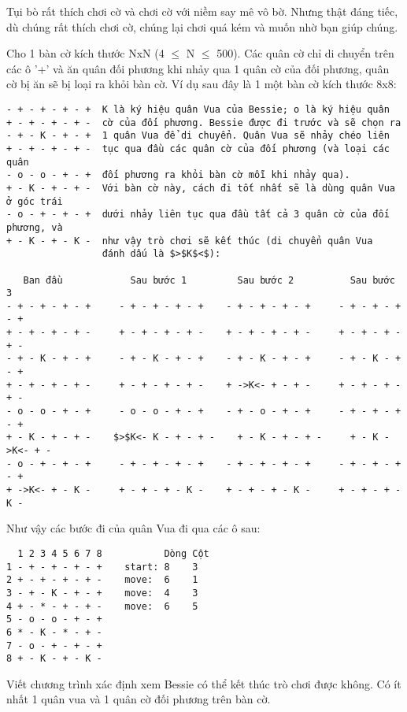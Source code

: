 



   Tụi bò rất thích chơi cờ và chơi cờ với niềm say mê vô bờ. Nhưng thật đáng tiếc, dù chúng rất thích chơi cờ, chúng lại chơi  quá kém và muốn nhờ bạn giúp chúng.  

   Cho 1 bàn cờ kích thước NxN (4  $\le$  N  $\le$  500).  Các quân cờ chỉ di chuyển trên các ô '+' và ăn quân đối phương khi nhảy qua 1 quân cờ của đối phương, quân cờ bị ăn sẽ bị loại ra khỏi bàn cờ. Ví dụ sau đây là 1 một bàn cờ kích thước 8x8:  
\begin{verbatim}
- + - + - + - +  K là ký hiệu quân Vua của Bessie; o là ký hiệu quân
+ - + - + - + -  cờ của đối phương. Bessie được đi trước và sẽ chọn ra 
- + - K - + - +  1 quân Vua để di chuyển. Quân Vua sẽ nhảy chéo liên 
+ - + - + - + -  tục qua đầu các quân cờ của đối phương (và loại các quân 
- o - o - + - +  đối phương ra khỏi bàn cờ mỗi khi nhảy qua).
+ - K - + - + -  Với bàn cờ này, cách đi tốt nhất sẽ là dùng quân Vua ở góc trái 
- o - + - + - +  dưới nhảy liên tục qua đầu tất cả 3 quân cờ của đối phương, và 
+ - K - + - K -  như vậy trò chơi sẽ kết thúc (di chuyển quân Vua
                 đánh dấu là $>$K$<$):

   Ban đầu            Sau bước 1         Sau bước 2          Sau bước 3
- + - + - + - +     - + - + - + - +    - + - + - + - +     - + - + - + - +
+ - + - + - + -     + - + - + - + -    + - + - + - + -     + - + - + - + -
- + - K - + - +     - + - K - + - +    - + - K - + - +     - + - K - + - +
+ - + - + - + -     + - + - + - + -    + ->K<- + - + -     + - + - + - + -
- o - o - + - +     - o - o - + - +    - + - o - + - +     - + - + - + - +
+ - K - + - + -    $>$K<- K - + - + -    + - K - + - + -     + - K ->K<- + -
- o - + - + - +     - + - + - + - +    - + - + - + - +     - + - + - + - +
+ ->K<- + - K -     + - + - + - K -    + - + - + - K -     + - + - + - K -
\end{verbatim}

   Như vậy các bước đi của quân Vua đi qua các ô sau:  
\begin{verbatim}
  1 2 3 4 5 6 7 8           Dòng Cột
1 - + - + - + - +    start: 8    3
2 + - + - + - + -    move:  6    1
3 - + - K - + - +    move:  4    3
4 + - * - + - + -    move:  6    5
5 - o - o - + - +
6 * - K - * - + - 
7 - o - + - + - + 
8 + - K - + - K - 
\end{verbatim}

   Viết chương trình xác định xem Bessie có thể kết thúc trò chơi được không. Có ít nhất 1 quân vua và 1 quân cờ đối phương trên bàn cờ.  

